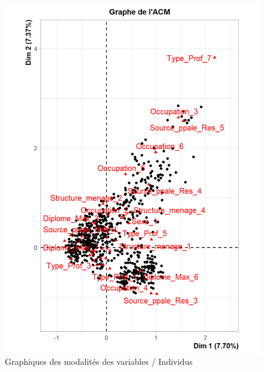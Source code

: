 \documentclass[11pt,a4paper, x11names]{article}\usepackage[]{graphicx}\usepackage[]{color}
\begin{document}
\begin{mdframed}
\begin{minipage}{0.45\textwidth}
\begin{figure}[H]
\includegraphics[scale=0.5]{graphiques/MCA2.png}
\caption{Graphiques des modalités des variables / Individus } \label{fig6:MCA2}
\end{figure}
\end{minipage}
\hfill
\end{mdframed}
\end{document}

